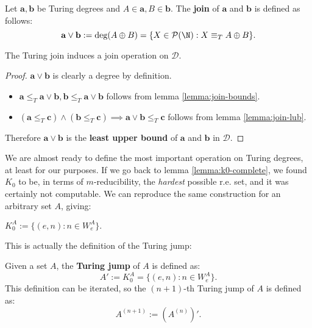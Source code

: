 \documentclass[../main.tex]{memoir}
\begin{document}
\begin{definition}
  Let $\mathbf{a}, \mathbf{b}$ be Turing degrees and $A \in \mathbf{a}, B \in \mathbf{b}$. The \textbf{join} of $\mathbf{a}$ and $\mathbf{b}$ is defined as follows:
  \[ \mathbf{a} \lor \mathbf{b} := \text{deg}(A \oplus B) = \{X \in \mathcal{P}(\N): X \equiv_T A \oplus B\}. \]
\end{definition}

\begin{theorem}
  The Turing join induces a join operation on $\mathbf{\mathcal{D}}$.
\end{theorem}
\begin{proof}
  $\mathbf{a} \lor \mathbf{b}$ is clearly a degree by definition.
  \begin{itemize}
  \item $\mathbf{a} \le_T \mathbf{a} \lor \mathbf{b}, \mathbf{b} \le_T \mathbf{a} \lor \mathbf{b}$ follows from lemma \ref{lemma:join-bounds}.
  \item $(\mathbf{a} \le_T \mathbf{c}) \land (\mathbf{b} \le_T \mathbf{c}) \implies \mathbf{a} \lor \mathbf{b} \le_T \mathbf{c}$ follows from lemma \ref{lemma:join-lub}.
  \end{itemize}
  Therefore $\mathbf{a} \lor \mathbf{b}$ is the \textbf{least upper bound} of $\mathbf{a}$ and $\mathbf{b}$ in $\mathbf{\mathcal{D}}$.
\end{proof}

We are almost ready to define the most important operation on Turing degrees, at least for our purposes. If we go back to lemma \ref{lemma:k0-complete}, we found $K_0$ to be, in terms of $m$-reducibility, the \textit{hardest} possible r.e. set, and it was certainly not computable. We can reproduce the same construction for an arbitrary set $A$, giving:

\begin{definition}
  $K_0^A := \{(e, n): n \in W_e^A\}.$
\end{definition}

This is actually the definition of the Turing jump:

\begin{definition}
  Given a set $A$, the \textbf{Turing jump} of $A$ is defined as:
  \[ A' := K_0^A = \{(e, n): n \in W_e^A\}. \]
  This definition can be iterated, so the $(n + 1)$-th Turing jump of $A$ is defined as:
  \[ A^{(n + 1)} := (A^{(n)})'. \]
\end{definition}
\end{document}
